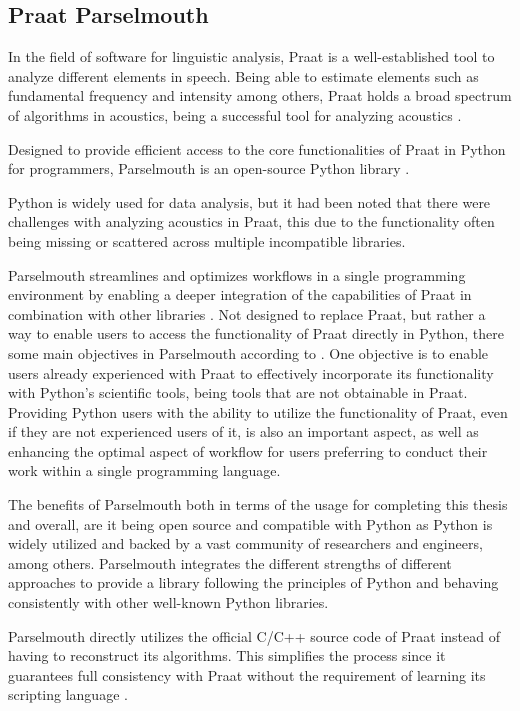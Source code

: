\subsection{Praat Parselmouth}

In the field of software for linguistic analysis, Praat is a well-established tool to analyze different elements in speech. Being able to estimate elements such as fundamental frequency and intensity among others, Praat holds a broad spectrum of algorithms in acoustics, being a successful tool for analyzing acoustics \autocite{Jadoul2024}.

Designed to provide efficient access to the core functionalities of Praat in Python for programmers, Parselmouth is an open-source Python library \autocite{Jadoul2018}.

Python is widely used for data analysis, but it had been noted that there were challenges with analyzing acoustics in Praat, this due to the functionality often being missing or scattered across multiple incompatible libraries.

Parselmouth streamlines and optimizes workflows in a single programming environment by enabling a deeper integration of the capabilities of Praat in combination with other libraries \autocite{Jadoul2024}. Not designed to replace Praat, but rather a way to enable users to access the functionality of Praat directly in Python, there some main objectives in Parselmouth according to \textcite{Jadoul2018}.
One objective is to enable users already experienced with Praat to effectively incorporate its functionality with Python’s scientific tools, being tools that are not obtainable in Praat.
Providing Python users with the ability to utilize the functionality of Praat, even if they are not experienced users of it, is also an important aspect, as well as enhancing the optimal aspect of workflow for users preferring to conduct their work within a single programming language.
 
The benefits of Parselmouth both in terms of the usage for completing this thesis and overall, are it being open source and compatible with Python as Python is widely utilized and backed by a vast community of researchers and engineers, among others. Parselmouth integrates the different strengths of different approaches to provide a library following the principles of Python and behaving consistently with other well-known Python libraries.

Parselmouth directly utilizes the official C/C++ source code of Praat instead of having to reconstruct its algorithms. This simplifies the process since it guarantees full consistency with Praat without the requirement of learning its scripting language \autocite{Jadoul2018}.

